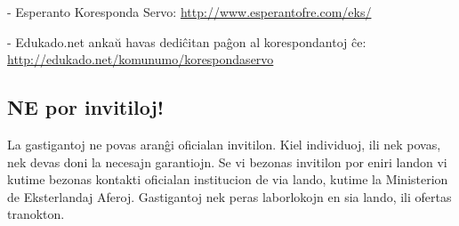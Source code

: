 {- Esperanto Koresponda Servo: \url{http://www.esperantofre.com/eks/}

- Edukado.net ankaŭ havas dediĉitan paĝon al korespondantoj ĉe: \url{http://edukado.net/komunumo/korespondaservo}

\subsection*{NE por invitiloj!}

La gastigantoj ne povas aranĝi oficialan invitilon. Kiel individuoj, ili nek povas, nek devas doni la necesajn garantiojn. Se vi bezonas invitilon por eniri landon vi kutime bezonas kontakti oficialan institucion de via lando, kutime la Ministerion de Eksterlandaj Aferoj. Gastigantoj nek peras laborlokojn en sia lando, ili ofertas tranokton.
}
